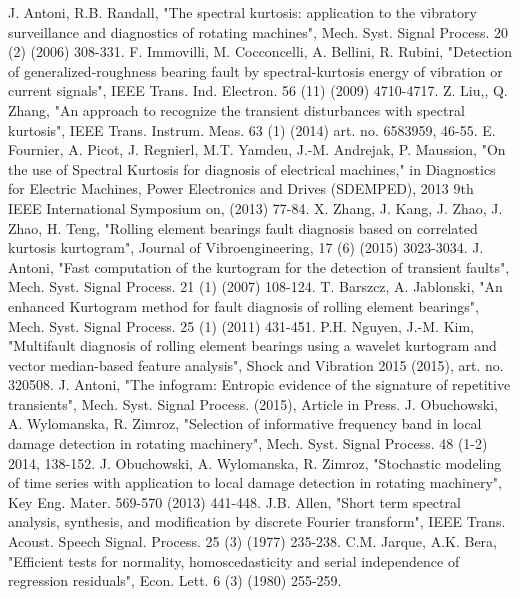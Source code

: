 \documentclass[11pt]{article} %
\begin{document}
\begin{thebibliography}{00}
 J. Antoni, R.B. Randall, "The spectral kurtosis: application to the vibratory surveillance and diagnostics of rotating machines", Mech. Syst. Signal Process. 20 (2) (2006) 308-331.
  F. Immovilli, M. Cocconcelli, A. Bellini, R. Rubini, "Detection of generalized-roughness bearing fault by spectral-kurtosis energy of vibration or current signals", IEEE Trans. Ind. Electron. 56 (11) (2009) 4710-4717.
 Z. Liu,, Q. Zhang, "An approach to recognize the transient disturbances with spectral kurtosis", IEEE Trans. Instrum. Meas. 63 (1) (2014) art. no. 6583959, 46-55.
 E. Fournier, A. Picot, J. Regnierl, M.T. Yamdeu, J.-M. Andrejak, P. Maussion, "On the use of Spectral Kurtosis for diagnosis of electrical machines," in Diagnostics for Electric Machines, Power Electronics and Drives (SDEMPED), 2013 9th IEEE International Symposium on, (2013) 77-84.
 X. Zhang, J. Kang, J. Zhao, J. Zhao, H. Teng, "Rolling element bearings fault diagnosis based on correlated kurtosis kurtogram", Journal of Vibroengineering, 17 (6) (2015) 3023-3034.
 J. Antoni, "Fast computation of the kurtogram for the detection of transient faults", Mech. Syst. Signal Process. 21 (1) (2007) 108-124.
 T. Barszcz, A. Jablonski, "An enhanced Kurtogram method for fault diagnosis of rolling element bearings", Mech. Syst. Signal Process. 25 (1) (2011) 431-451.
  P.H. Nguyen, J.-M. Kim, "Multifault diagnosis of rolling element bearings using a wavelet kurtogram and vector median-based feature analysis", Shock and Vibration 2015 (2015), art. no. 320508.
 J. Antoni, "The infogram: Entropic evidence of the signature of repetitive transients", Mech. Syst. Signal Process. (2015), Article in Press.
 J. Obuchowski, A. Wylomanska, R. Zimroz, "Selection of informative frequency band in local damage detection in rotating machinery", Mech. Syst. Signal Process. 48 (1-2) 2014, 138-152.
 J. Obuchowski, A. Wylomanska, R. Zimroz, "Stochastic modeling of time series with application to local damage detection in rotating machinery", Key Eng. Mater. 569-570 (2013) 441-448.
 J.B. Allen, "Short term spectral analysis, synthesis, and modification by discrete Fourier transform", IEEE Trans. Acoust. Speech Signal. Process. 25 (3) (1977) 235-238.
 C.M. Jarque, A.K. Bera, "Efficient tests for normality, homoscedasticity and serial independence of regression residuals", Econ. Lett. 6 (3) (1980) 255-259.

\end{thebibliography}
\end{document}
